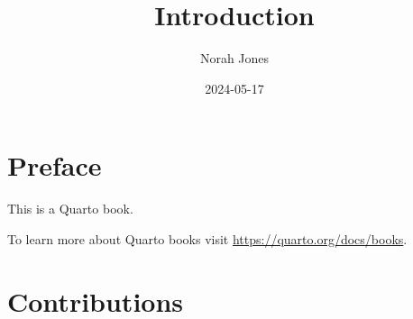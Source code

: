 \documentclass[
  letterpaper,
  DIV=11,
  numbers=noendperiod]{scrreprt}
\title{Introduction}
\author{Norah Jones}
\date{2024-05-17}
\renewcommand*\contentsname{Table of contents}
\newcommand\contentsname{Table of contents}
\begin{document}
\maketitle

\renewcommand*\contentsname{Table of contents}
{
\hypersetup{linkcolor=}
\setcounter{tocdepth}{2}
\tableofcontents
}

\chapter*{Preface}\label{preface}


This is a Quarto book.

To learn more about Quarto books visit
\url{https://quarto.org/docs/books}.


\chapter{Contributions}\label{contributions}
\end{document}
